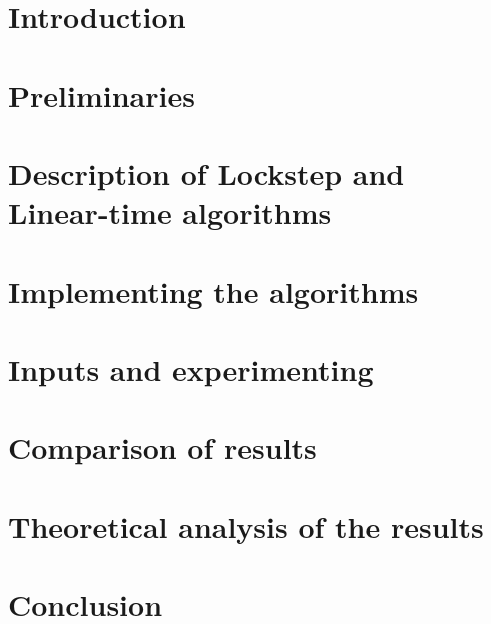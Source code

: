 \documentclass[a4, english]{article}
\title{\titlecontent}
\author{Magdalena Kalin-Czerska}
\author{Mikael Bisgaard Dahlsen-Jensen}
\affil{Aarhus University}
\newcommand{\sectionpath}{../sections/}
\begin{document}
 \pagestyle{empty}

\maketitle


\newpage
\section{Introduction}

\section{Preliminaries}

\section{Description of  Lockstep and Linear-time algorithms}

\section{Implementing the algorithms}


\section{Inputs and experimenting}


\section{Comparison of results}

\section{Theoretical analysis of the results}

\section{Conclusion}

\printbibliography
\appendix
\end{document}
